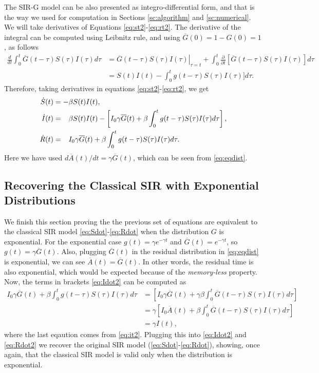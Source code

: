 \documentclass[twoside,USenglish,10pt]{article}
\newcommand{\Ab}{\overline{A}\xspace}
\newcommand{\Gb}{\overline{G}\xspace}
\newcommand{\phm}{\ensuremath\phantom{-}\xspace}
\begin{document}
The SIR-G model can be also presented as integro-differential form, and that is the way we used for computation in Sections \ref{sc:algorithm} and \ref{sc:numerical}. We will take derivatives of Equations \eqref{eq:st2}-\eqref{eq:rt2}. The derivative of the integral can be computed using Leibnitz rule, and using $\Gb(0)=1-G(0)=1$, as follows
\begin{align*}
	\frac{d}{dt}\int_0^t \Gb(t-\tau) S(\tau)I(\tau)d\tau
	&= \left. \Gb(t-\tau) S(\tau)I(\tau) \right|_{\tau=t}
	 + \int_0^t \frac{\partial}{\partial t} [\Gb(t-\tau) S(\tau)I(\tau)]d\tau \\
	&= S(t)I(t) -  \int_0^t g(t-\tau) S(\tau)I(\tau)]d\tau.
\end{align*}
Therefore, taking derivatives in equations \eqref{eq:st2}-\eqref{eq:rt2}, we get
\begin{subequations}
	\begin{align}
		\dot S(t) &= -\beta S(t)I(t), 
		\label{eq:Sdot2} \\
		\dot I(t) &= \phm  \beta  S(t)I(t) - \left[ I_0 \gamma \Gb(t) +  \beta\int_0^t g(t-\tau) S(\tau)I(\tau)d\tau \right],
		\label{eq:Idot2} \\
		\dot R(t) &= \phm I_0 \gamma \Gb(t) + \beta\int_0^t g(t-\tau) S(\tau)I(\tau)d\tau.
		\label{eq:Rdot2}
	\end{align}
\end{subequations}
Here we have used $d\Ab(t)/dt=\gamma\Gb(t)$, which  can be seen from \eqref{eq:eqdist}.


\subsection{Recovering the Classical SIR with Exponential Distributions}

We finish this section proving the the previous set of equations are equivalent to the classical SIR model \eqref{eq:Sdot}-\eqref{eq:Rdot} when the distribution $G$ is exponential. 
For the exponential case  $g(t)=\gamma e^{-\gamma t}$ and $\Gb(t)=e^{-\gamma t}$, so $g(t)=\gamma\Gb(t)$. Also, plugging $\Gb(t)$ in the residual distribution in \eqref{eq:eqdist} is exponential, we can see $\Ab(t) = \Gb(t)$. In other words, the residual time is also exponential, which would be expected because of the \textit{memory-less} property.
Now, the terms in brackets \eqref{eq:Idot2} can be computed as 
\begin{align}
I_0 \gamma \Gb(t) + \beta\int_0^t g(t-\tau) S(\tau)I(\tau)d\tau 
&= \left[ I_0  \gamma\Gb(t) + \gamma\beta\int_0^t \Gb(t-\tau) S(\tau)I(\tau)d\tau \right]\\
&= \gamma\left[ I_0  \Ab(t) + \beta\int_0^t \Gb(t-\tau) S(\tau)I(\tau)d\tau \right]\\
&= \gamma I(t),
\end{align}
where the last eqaution comes from \eqref{eq:it2}.
Plugging this into \eqref{eq:Idot2} and \eqref{eq:Rdot2} we recover the original SIR model (\eqref{eq:Sdot}-\eqref{eq:Rdot}), showing, once again, that the classical SIR model is valid only when the distribution is exponential.
\end{document}
